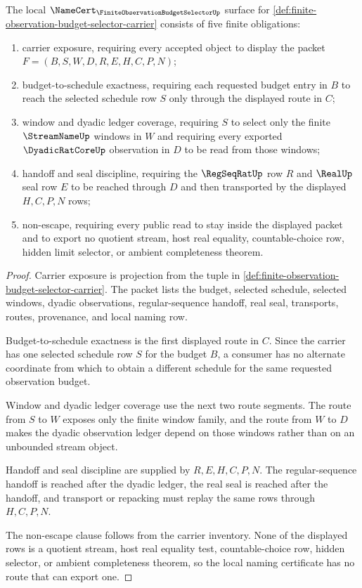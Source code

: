 \begin{theorem}
\label{thm:finite-observation-budget-selector-namecert-obligations}
The local $\NameCert_{\FiniteObservationBudgetSelectorUp}$ surface for \autoref{def:finite-observation-budget-selector-carrier} consists of five finite obligations:
\begin{enumerate}
\item carrier exposure, requiring every accepted object to display the packet $F=(B,S,W,D,R,E,H,C,P,N)$;
\item budget-to-schedule exactness, requiring each requested budget entry in $B$ to reach the selected schedule row $S$ only through the displayed route in $C$;
\item window and dyadic ledger coverage, requiring $S$ to select only the finite $\StreamNameUp$ windows in $W$ and requiring every exported $\DyadicRatCoreUp$ observation in $D$ to be read from those windows;
\item handoff and seal discipline, requiring the $\RegSeqRatUp$ row $R$ and $\RealUp$ seal row $E$ to be reached through $D$ and then transported by the displayed $H,C,P,N$ rows;
\item non-escape, requiring every public read to stay inside the displayed packet and to export no quotient stream, host real equality, countable-choice row, hidden limit selector, or ambient completeness theorem.
\end{enumerate}
\end{theorem}
\begin{proof}
Carrier exposure is projection from the tuple in \autoref{def:finite-observation-budget-selector-carrier}. The packet lists the budget, selected schedule, selected windows, dyadic observations, regular-sequence handoff, real seal, transports, routes, provenance, and local naming row.

Budget-to-schedule exactness is the first displayed route in $C$. Since the carrier has one selected schedule row $S$ for the budget $B$, a consumer has no alternate coordinate from which to obtain a different schedule for the same requested observation budget.

Window and dyadic ledger coverage use the next two route segments. The route from $S$ to $W$ exposes only the finite window family, and the route from $W$ to $D$ makes the dyadic observation ledger depend on those windows rather than on an unbounded stream object.

Handoff and seal discipline are supplied by $R,E,H,C,P,N$. The regular-sequence handoff is reached after the dyadic ledger, the real seal is reached after the handoff, and transport or repacking must replay the same rows through $H,C,P,N$.

The non-escape clause follows from the carrier inventory. None of the displayed rows is a quotient stream, host real equality test, countable-choice row, hidden selector, or ambient completeness theorem, so the local naming certificate has no route that can export one.
\end{proof}

